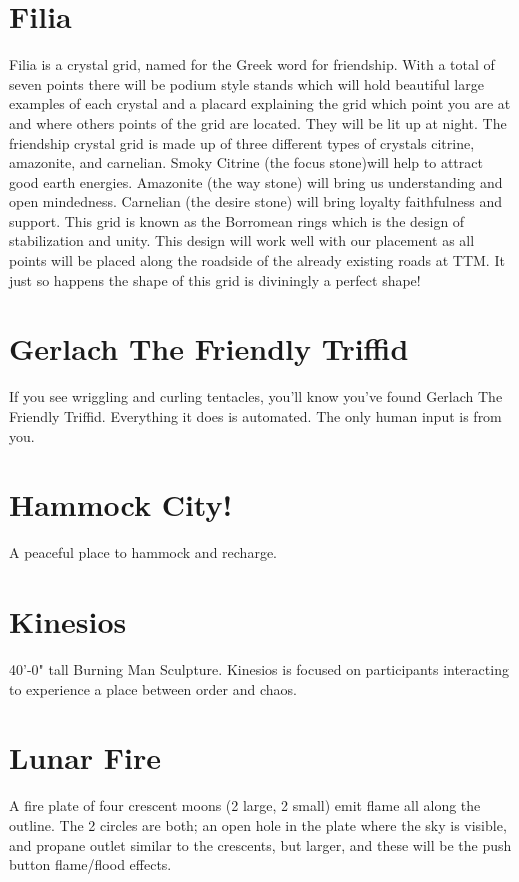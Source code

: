 \section*{Filia}
Filia is a crystal grid, named for the Greek word for friendship. With a total of seven points there will be podium style stands which will hold beautiful large examples of each crystal and a placard explaining the grid which point you are at and where others points of the grid are located. They will be lit up at night. The friendship crystal grid is made up of three different types of crystals citrine, amazonite, and carnelian. Smoky Citrine (the focus stone)will help to attract good earth energies. Amazonite (the way stone) will bring us understanding and open mindedness. Carnelian (the desire stone) will bring loyalty faithfulness and support. This grid is known as the Borromean rings which is the design of stabilization and unity. This design will work well with our placement as all points will be placed along the roadside of the already existing roads at TTM. It just so happens the shape of this grid is diviningly a perfect shape!




\section*{Gerlach The Friendly Triffid}
If you see wriggling and curling tentacles, you'll know you've found Gerlach The Friendly Triffid. Everything it does is automated. The only human input is from you. 


\section*{Hammock City! }
A peaceful place to hammock and recharge. 

\section*{Kinesios}
40'-0" tall Burning Man Sculpture. Kinesios is focused on participants interacting to experience a place between order and chaos.


\section*{Lunar Fire}
A fire plate of four crescent moons (2 large, 2 small) emit flame all along the outline. The 2 circles are both; an open hole in the plate where the sky is visible, and propane outlet similar to the crescents, but larger, and these will be the push button flame/flood effects. 

